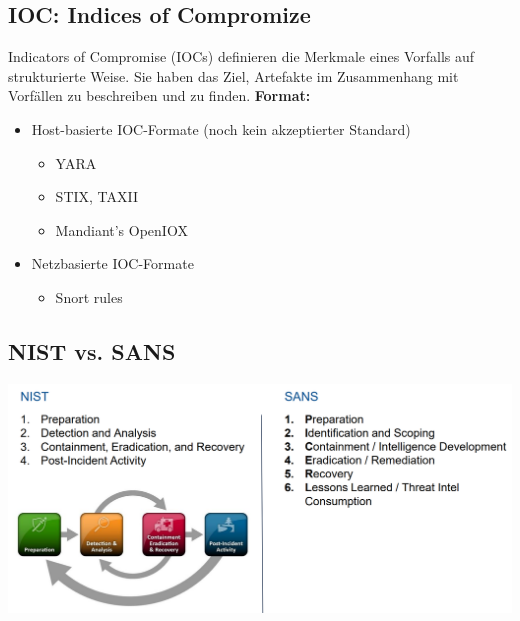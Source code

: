 \subsection{IOC: Indices of Compromize}
Indicators of Compromise (IOCs) definieren die Merkmale eines Vorfalls auf strukturierte Weise. Sie haben das Ziel, Artefakte im Zusammenhang mit Vorfällen zu beschreiben und zu finden.
\textbf{Format:}
\begin{itemize}
    \item Host-basierte IOC-Formate (noch kein akzeptierter Standard)
    \begin{itemize}
        \item YARA
        \item STIX, TAXII
        \item Mandiant's OpenIOX
    \end{itemize}
    \item Netzbasierte IOC-Formate
    \begin{itemize}
        \item Snort rules
    \end{itemize}
\end{itemize}



\subsection{NIST vs. SANS}
\begin{center}
    \includegraphics[width=1.0\linewidth]{./img/02-begriffe/nist_sans}
\end{center}